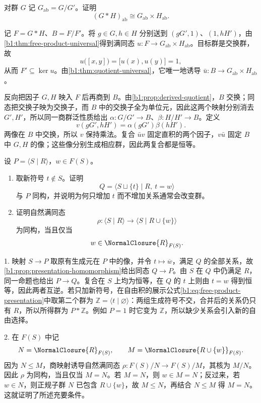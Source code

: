 \begin{exercise}\label{b1:ex:08-free-product-abelianization}
	对群 \(G\) 记 \(G_{\mathrm{ab}}=G/G'\)。证明
	\[
		(G*H)_{\mathrm{ab}}\cong G_{\mathrm{ab}}\times H_{\mathrm{ab}}.
	\]
\end{exercise}
\begin{solution}
	记 \(F=G*H\)、\(B=F/F'\)。将 \(g\in G,h\in H\) 分别送到 \((gG',1)\)、\((1,hH')\)，由\cref{b1:thm:free-product-universal}得到满同态 \(u:F\to G_{\mathrm{ab}}\times H_{\mathrm{ab}}\)。目标群是交换群，故
	\[
		u\bigl([x,y]\bigr)=\bigl[u(x),u(y)\bigr]=1,
	\]
	从而 \(F'\subseteq\ker u\)。由\cref{b1:thm:quotient-universal}，它唯一地诱导 \(\bar u:B\to G_{\mathrm{ab}}\times H_{\mathrm{ab}}\)。

	反向把因子 \(G,H\) 映入 \(F\) 后再商到 \(B\)。由\cref{b1:prop:derived-quotient}，\(B\) 交换；同态把交换子映为交换子，而 \(B\) 中的交换子全为单位元，因此这两个映射分别消去 \(G',H'\)，所以同一商群泛性质给出 \(\alpha:G/G'\to B\)、\(\beta:H/H'\to B\)。定义
	\[
		v(gG',hH')=\alpha(gG')\beta(hH').
	\]
	两像在 \(B\) 中交换，所以 \(v\) 保持乘法。复合 \(\bar uv\) 固定直积的两个因子，\(v\bar u\) 固定 \(B\) 中 \(G,H\) 的像；这些像分别生成相应群，因此两复合都是恒等。
\end{solution}

\begin{exercise}\label{b1:ex:08-redundant-generator}
	设 \(P=\langle S\mid R\rangle\)，\(w\in F(S)\)。
	\begin{enumerate}
		\item 取新符号 \(t\notin S\)。证明
			\[
				Q=\bigl\langle S\sqcup\{t\}\mid R,\ t=w\bigr\rangle
			\]
			与 \(P\) 同构，并说明为何只增加 \(t\) 而不增加关系通常会改变群。
		\item 证明自然满同态
			\[
				\rho:\langle S\mid R\rangle \longrightarrow \langle S\mid R\cup\{w\}\rangle
			\]
			为同构，当且仅当
			\[
				w\in\NormalClosure{R}_{F(S)}.
			\]
	\end{enumerate}
\end{exercise}
\begin{solution}
	1. 映射 \(S\to P\) 取原有生成元在 \(P\) 中的像，并令 \(t\mapsto\overline w\)，满足 \(Q\) 的全部关系，故\cref{b1:prop:presentation-homomorphism}给出同态 \(Q\to P\)。由 \(S\) 在 \(Q\) 中仍满足 \(R\)，同一命题也给出 \(P\to Q\)。复合在 \(S\) 上均为恒等，在 \(Q\) 的 \(t\) 上则由 \(t=w\) 得到恒等，因此两者互逆。若只加新符号，在自由积的展示公式\eqref{b1:eq:free-product-presentation}中取第二个群为 \(\mathbb Z=\langle t\mid\varnothing\rangle\)：两组生成符号不交，合并后的关系仍只有 \(R\)，所以所得群为 \(P*\mathbb Z\)。例如 \(P=1\) 时它变为 \(\mathbb Z\)，所以缺少关系会引入新的自由选择。

	2. 在 \(F(S)\) 中记
	\[
		N=\NormalClosure{R}_{F(S)},\qquad M=\NormalClosure{R\cup\{w\}}_{F(S)}.
	\]
	因为 \(N\leq M\)，商映射诱导自然满同态 \(\rho:F(S)/N\rightarrow F(S)/M\)，其核为 \(M/N\)。因此 \(\rho\) 为同构，当且仅当 \(M=N\)。若 \(M=N\)，则 \(w\in M=N\)；反过来，若 \(w\in N\)，则正规子群 \(N\) 已包含 \(R\cup\{w\}\)，故 \(M\leq N\)，再结合 \(N\leq M\) 得 \(M=N\)。这就证明了所述充要条件。
\end{solution}

